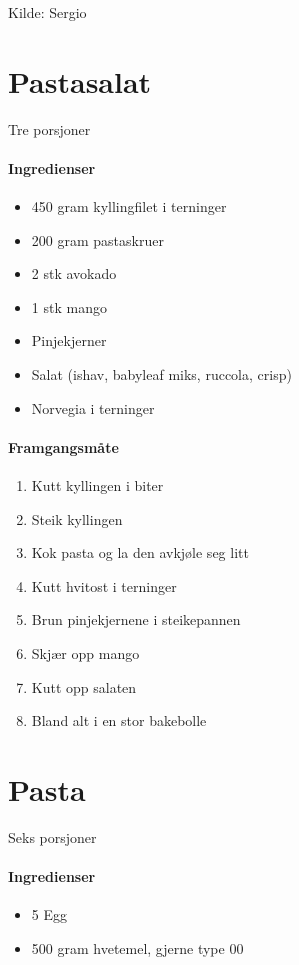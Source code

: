 \documentclass[12pt,a4paper]{book}
\begin{document}
Kilde: Sergio
\clearpage{}
\clearpage{}\section{﻿Pastasalat}
Tre porsjoner

\paragraph{Ingredienser}
\begin{itemize}[noitemsep]
	\item 450 gram kyllingfilet i terninger
	\item 200 gram pastaskruer
	\item 2 stk avokado
	\item 1 stk mango
	\item Pinjekjerner
	\item Salat (ishav, babyleaf miks, ruccola, crisp)
	\item Norvegia i terninger
\end{itemize}

\paragraph{Framgangsmåte}
\begin{enumerate}[noitemsep]
	\item Kutt kyllingen i biter
	\item Steik kyllingen
	\item Kok pasta og la den avkjøle seg litt
	\item Kutt hvitost i terninger
	\item Brun pinjekjernene i steikepannen
	\item Skjær opp mango 
	\item Kutt opp salaten
	\item Bland alt i en stor bakebolle
\end{enumerate}
\clearpage{}
\clearpage{}\section{﻿Pasta}
Seks porsjoner

\paragraph{Ingredienser}
\begin{itemize}[noitemsep]
	\item 5 Egg
	\item 500 gram hvetemel, gjerne type 00
\end{itemize}
\end{document}
